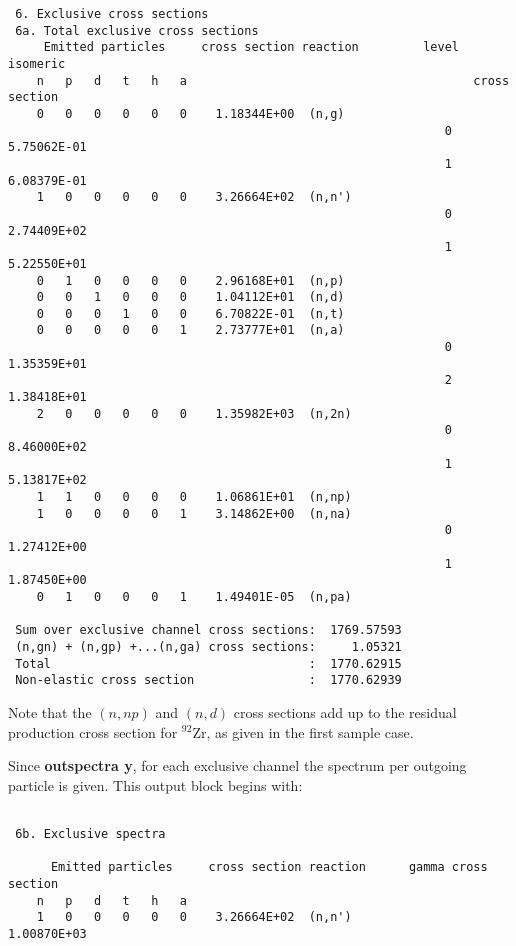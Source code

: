 \begin{samplecase}
{\begin{verbatim}
 6. Exclusive cross sections                                                    
 6a. Total exclusive cross sections                                             
     Emitted particles     cross section reaction         level    isomeric    
    n   p   d   t   h   a                                        cross section  
    0   0   0   0   0   0    1.18344E+00  (n,g)
                                                             0     5.75062E-01  
                                                             1     6.08379E-01  
    1   0   0   0   0   0    3.26664E+02  (n,n')
                                                             0     2.74409E+02  
                                                             1     5.22550E+01  
    0   1   0   0   0   0    2.96168E+01  (n,p)            
    0   0   1   0   0   0    1.04112E+01  (n,d)            
    0   0   0   1   0   0    6.70822E-01  (n,t)
    0   0   0   0   0   1    2.73777E+01  (n,a)
                                                             0     1.35359E+01  
                                                             2     1.38418E+01  
    2   0   0   0   0   0    1.35982E+03  (n,2n)           
                                                             0     8.46000E+02  
                                                             1     5.13817E+02  
    1   1   0   0   0   0    1.06861E+01  (n,np)
    1   0   0   0   0   1    3.14862E+00  (n,na)
                                                             0     1.27412E+00  
                                                             1     1.87450E+00  
    0   1   0   0   0   1    1.49401E-05  (n,pa)

 Sum over exclusive channel cross sections:  1769.57593
 (n,gn) + (n,gp) +...(n,ga) cross sections:     1.05321
 Total                                    :  1770.62915
 Non-elastic cross section                :  1770.62939
\end{verbatim} } \renewcommand{\baselinestretch}{1.07}\small\normalsize
\noindent
Note that the $(n,np)$ and $(n,d)$ cross sections add up to the residual 
production cross section for ${}^{92}$Zr, as given in the first sample case.

Since {\bf outspectra y}, for each exclusive channel the spectrum per 
outgoing particle is given. This output block begins with:

{\small \begin{verbatim}

 6b. Exclusive spectra

      Emitted particles     cross section reaction      gamma cross section
    n   p   d   t   h   a
    1   0   0   0   0   0    3.26664E+02  (n,n')            1.00870E+03


\end{verbatim}}
\end{samplecase}
